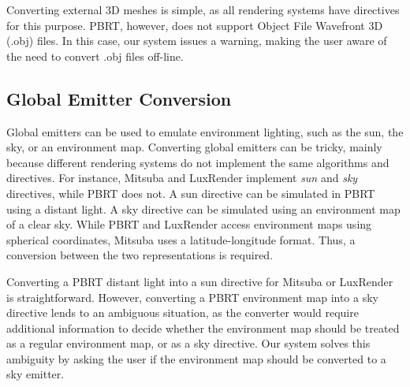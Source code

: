 Converting external 3D meshes is simple, as all rendering systems have directives for this purpose. PBRT, however, does not support Object File Wavefront 3D
(.obj) files. In this case, our system issues a warning, making the user aware of the need to convert .obj files off-line.

\subsection{Global Emitter Conversion}
Global emitters can be used to emulate environment lighting, such as the sun, the sky, or an environment map. Converting global emitters can be tricky, mainly because different rendering systems do not implement the same algorithms and directives. For instance, Mitsuba and LuxRender implement {\it sun} and {\it sky} directives, while PBRT does not. A sun directive can be simulated in PBRT using a distant light. A sky directive can be simulated using an environment map of a clear sky. While PBRT and LuxRender access environment maps using spherical coordinates, Mitsuba uses a latitude-longitude format. Thus, a conversion between the two representations is required. 
  
Converting a PBRT distant light into a sun directive for Mitsuba or LuxRender is straightforward. However, converting a PBRT environment map into a sky directive lends to an ambiguous situation, as the converter would require additional information to decide whether the environment map should be treated as a regular environment map, or as a sky directive. Our system solves this ambiguity by asking the user if the environment map should be converted to a sky emitter.


